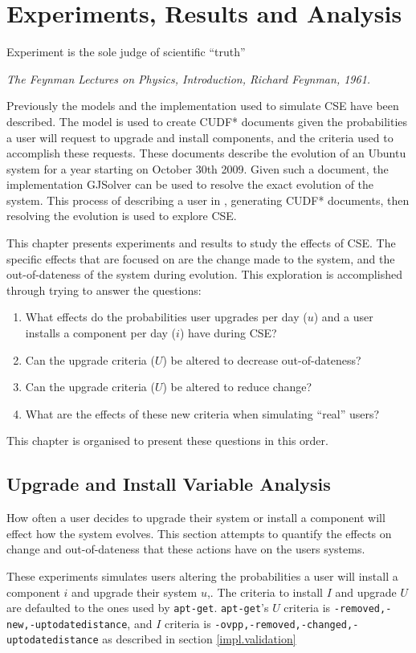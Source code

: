 
\chapter{Experiments, Results and Analysis}
\label{experiments}
\epigraph{Experiment is the sole judge of scientific ``truth''}
{\textit{The Feynman Lectures on Physics, Introduction, Richard Feynman, 1961.}}
Previously the models and the implementation used to simulate CSE have been described.
The \usermodel model is used to create CUDF* documents given the probabilities a user will request to upgrade and install components, 
and the criteria used to accomplish these requests.
These documents describe the evolution of an Ubuntu system for a year starting on October 30th 2009.
Given such a document, the implementation GJSolver can be used to resolve the exact evolution of the system.
This process of describing a user in \usermodel, generating CUDF* documents, then resolving the evolution is used to explore CSE.

This chapter presents experiments and results to study the effects of CSE.
The specific effects that are focused on are the change made to the system, and the out-of-dateness of the system during evolution.
This exploration is accomplished through trying to answer the questions:
\begin{enumerate}
  \item What effects do the probabilities user upgrades per day ($u$) and a user installs a component per day ($i$) have during CSE?
  \item Can the upgrade criteria ($U$) be altered to decrease out-of-dateness?
  \item Can the upgrade criteria ($U$) be altered to reduce change?
  \item What are the effects of these new criteria when simulating ``real'' users?
\end{enumerate}
This chapter is organised to present these questions in this order. 

\section{Upgrade and Install Variable Analysis}
How often a user decides to upgrade their system or install a component will effect how the system evolves.
This section attempts to quantify the effects on change and out-of-dateness that these actions have on the users systems.

These experiments simulates users altering the probabilities a user will install a component $i$ and upgrade their system $u$,.
The criteria to install $I$ and upgrade $U$ are defaulted to the ones used by \texttt{apt-get}. 
\texttt{apt-get}'s $U$ criteria is \texttt{-removed,-new,-uptodatedistance}, and $I$ criteria is \texttt{-ovpp,-removed,-changed,-uptodatedistance} as described in section \ref{impl.validation} 

